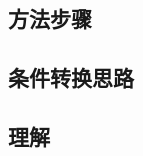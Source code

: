 \documentclass[a4paper,12pt]{article}
\begin{document}
    \begin{enumerate}

    \end{enumerate}

    \subsection{方法步骤}

    \begin{enumerate}

    \end{enumerate}

    \subsection{条件转换思路}

    \begin{enumerate}

    \end{enumerate}

    \subsection{理解}

    \begin{enumerate}
    \end{enumerate}
\end{document}
